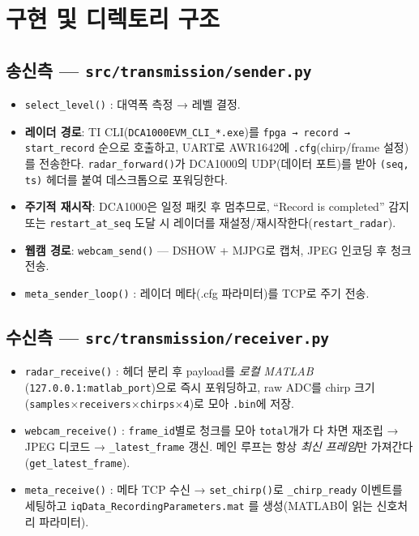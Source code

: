 \chapter{구현 및 디렉토리 구조}

\section{송신측 — \texttt{src/transmission/sender.py}}
\begin{itemize}
  \item \texttt{select\_level()} : 대역폭 측정 → 레벨 결정.
  \item \textbf{레이더 경로}: TI CLI(\texttt{DCA1000EVM\_CLI\_*.exe})를
        \texttt{fpga → record → start\_record} 순으로 호출하고, UART로 AWR1642에
        \texttt{.cfg}(chirp/frame 설정)를 전송한다. \texttt{radar\_forward()}가
        DCA1000의 UDP(데이터 포트)를 받아 \texttt{(seq, ts)} 헤더를 붙여 데스크톱으로
        포워딩한다.
  \item \textbf{주기적 재시작}: DCA1000은 일정 패킷 후 멈추므로,
        ``Record is completed'' 감지 또는 \texttt{restart\_at\_seq} 도달 시
        레이더를 재설정/재시작한다(\texttt{restart\_radar}).
  \item \textbf{웹캠 경로}: \texttt{webcam\_send()} — DSHOW + MJPG로 캡처,
        JPEG 인코딩 후 청크 전송.
  \item \texttt{meta\_sender\_loop()} : 레이더 메타(.cfg 파라미터)를 TCP로 주기 전송.
\end{itemize}

\section{수신측 — \texttt{src/transmission/receiver.py}}
\begin{itemize}
  \item \texttt{radar\_receive()} : 헤더 분리 후 payload를 \emph{로컬 MATLAB}
        (\texttt{127.0.0.1:matlab\_port})으로 즉시 포워딩하고, raw ADC를 chirp 크기
        (\texttt{samples$\times$receivers$\times$chirps$\times$4})로 모아 \texttt{.bin}에 저장.
  \item \texttt{webcam\_receive()} : \texttt{frame\_id}별로 청크를 모아 \texttt{total}개가
        다 차면 재조립 → JPEG 디코드 → \texttt{\_latest\_frame} 갱신. 메인 루프는
        항상 \emph{최신 프레임}만 가져간다(\texttt{get\_latest\_frame}).
  \item \texttt{meta\_receive()} : 메타 TCP 수신 → \texttt{set\_chirp()}로
        \texttt{\_chirp\_ready} 이벤트를 세팅하고 \texttt{iqData\_RecordingParameters.mat}
        를 생성(MATLAB이 읽는 신호처리 파라미터).
\end{itemize}

